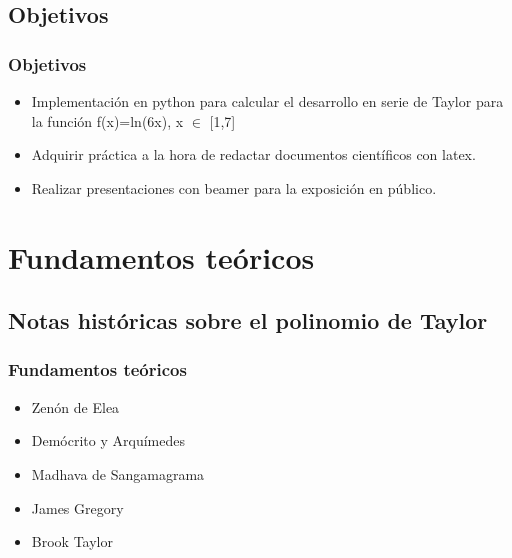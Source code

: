 \documentclass{beamer}
\begin{document}
\subsection{Objetivos}
\begin{frame}
\frametitle{Objetivos}
\begin{itemize}
 \item 
    Implementación en python para calcular el desarrollo en serie de Taylor para la función f(x)=ln(6x), x $\in$ [1,7]
 \item
    Adquirir práctica a la hora de redactar documentos científicos con latex.
 \item
    Realizar presentaciones con beamer para la exposición en público.
 
\end{itemize}
\end{frame}

\section{Fundamentos teóricos}
\subsection{Notas históricas sobre el polinomio de Taylor}
\begin{frame}
 \frametitle{Fundamentos teóricos}
 \begin{itemize}
  \item Zenón de Elea
  \item Demócrito y Arquímedes 
  \item Madhava de Sangamagrama
  \item James Gregory 
  \item Brook Taylor
 \end{itemize}

\end{frame}

\end{document}
